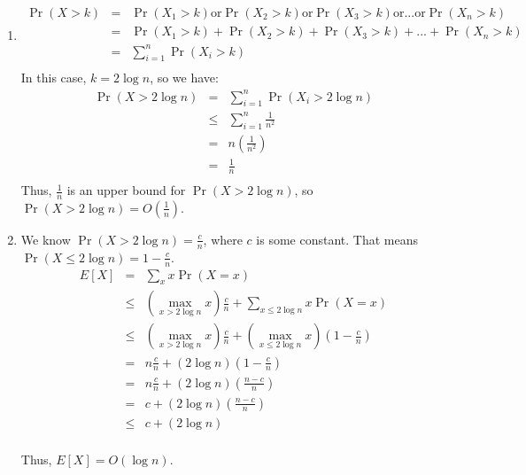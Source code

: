 \documentclass[12pt]{article}
\begin{document}
\begin{enumerate}[label=(\alph*)]
  \item
  \begin{eqnarray*}
  \Pr(X > k) &=& \Pr(X_1 > k) \text{or} \Pr(X_2 > k) \text{or} \Pr(X_3 > k) \text{or} ... \text{or} \Pr(X_n > k)\\
  &=& \Pr(X_1 > k) + \Pr(X_2 > k) + \Pr(X_3 > k) + ... + \Pr(X_n > k)\\
  &=& \sum_{i=1}^n \Pr(X_i > k)\\
  \end{eqnarray*}
  In this case, $k = 2\log n$, so we have:
  \begin{eqnarray*}
  \Pr(X > 2\log n) &=& \sum_{i=1}^n \Pr(X_i > 2\log n)\\
  &\le& \sum_{i=1}^n \frac{1}{n^2}\\
  &=& n \left(\frac{1}{n^2}\right)\\
  &=& \frac{1}{n}\\
  \end{eqnarray*}
  Thus, $\frac{1}{n}$ is an upper bound for $\Pr(X > 2\log n)$, so $\Pr(X > 2\log n) = O\left(\frac{1}{n}\right)$.
  \item We know $\Pr(X > 2\log n) = \frac{c}{n}$, where $c$ is some constant. That means $\Pr(X \le 2\log n) = 1 - \frac{c}{n}$.
  \begin{eqnarray*} 
  E[X] &=& \sum_x x\Pr(X = x)\\
  &\le& \left(\max_{x > 2\log n} x\right) \frac{c}{n} + \sum_{x \le 2\log n} x\Pr(X = x)\\
  &\le& \left(\max_{x > 2\log n} x\right) \frac{c}{n} + \left(\max_{x \le 2\log n} x\right) \left(1 -\frac{c}{n}\right) \\
  &=& n \frac{c}{n} + (2 \log n)\left(1 -\frac{c}{n}\right)\\
  &=& n \frac{c}{n} + (2 \log n)\left(\frac{n-c}{n}\right)\\
  &=& c + (2 \log n)\left(\frac{n-c}{n}\right)\\
  &\le& c + (2 \log n)\\
  \end{eqnarray*}

  Thus, $E[X] = O(\log n)$.

\end{enumerate}
\end{document}

